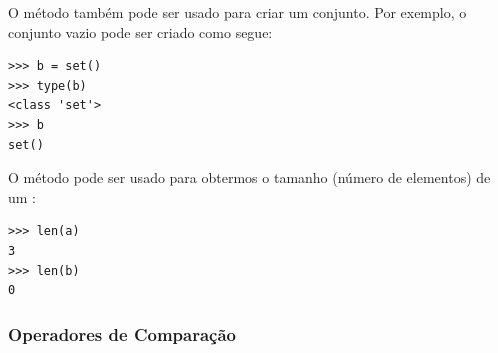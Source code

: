 O método {\PYTHONsetMethod} também pode ser usado para criar um conjunto. Por exemplo, o conjunto vazio pode ser criado como segue:

\begin{lstlisting}
>>> b = set()
>>> type(b)
<class 'set'>
>>> b
set()
\end{lstlisting}

O método {\PYTHONlen} pode ser usado para obtermos o tamanho (número de elementos) de um {\PYTHONset}:

\begin{lstlisting}
>>> len(a)
3
>>> len(b)
0
\end{lstlisting}

\subsubsection{Operadores de Comparação}\label{cap_lingua_sec_colecao:sssec:opcomp}

